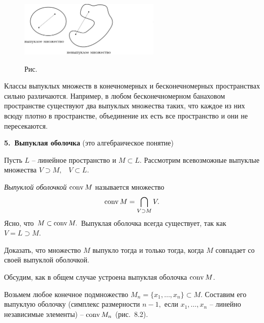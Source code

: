   \begin{figure}[ht]
\begin{center}
\includegraphics[width=0.6\textwidth]{pict/pict08-1.eps}
\end{center}
 \bigskip
 \label{r8-1}

 \centerline{Рис.~\theris}
 \bigskip
\end{figure}



  {Классы выпуклых множеств в конечномерных и бесконечномерных} пространствах
 сильно различаются. Например, в
 любом бесконечномерном банаховом пространстве существуют два выпуклых
 множества таких, что каждое из них всюду плотно в пространстве,
 объединение их есть все пространство и они не пересекаются.

\vspace{5mm}
{\bf 5.~Выпуклая оболочка} {(это алгебраическое понятие)}
\vspace{5mm}

Пусть $L$ -- линейное пространство и
 $M\subset L.$ Рассмотрим всевозможные выпуклые множества
 $V\supset M,$~ $V\subset L.$

 {\it Выпуклой оболочкой} ${\rm conv\,} M$ называется множество
 $$
 {\rm conv\,} M=\bigcap_{V\supset M} V.
 $$
 Ясно, что $M\subset {\rm conv\,} M.$ Выпуклая оболочка
 всегда существует, так как $V=L\supset M.$

 \ex
 Доказать, что множество $M$ выпукло тогда и только тогда, когда $M$
 совпадает со своей выпуклой оболочкой.

{Обсудим}, как в общем случае устроена выпуклая оболочка ${\rm conv\,} M$.

 Возьмем любое конечное подмножество $M_n=\{ x_1,\ldots,x_n\}\subset M.$
 Составим его выпуклую оболочку (симплекс размерности $n-1,$
 если $x_1,\ldots,x_n$ -- линейно независимые элементы) -- ${\rm conv\,} M_n$ (рис.~8.2).

\vspace{10mm}


